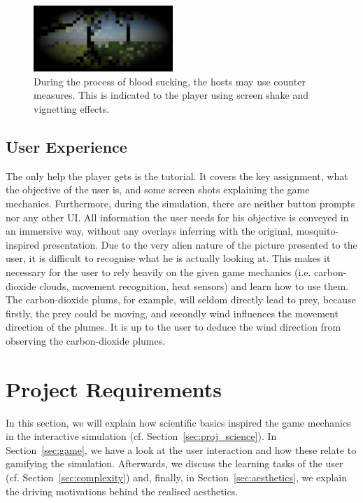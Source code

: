 \documentclass{sig-alternate-05-2015}
\begin{document}
\begin{figure}[ht!]
\includegraphics[width=0.47\textwidth]{Figures/danger.png}
\caption{During the process of blood sucking, the hosts may use counter measures. This is indicated to the player using screen shake and vignetting effects.}
\label{fig:danger}
\end{figure}



\subsection{User Experience}
\label{sec:ux}
The only help the player gets is the tutorial. It covers the key assignment, what the objective of the user is, and some screen shots explaining the game mechanics. Furthermore, during the simulation, there are neither button prompts nor any other UI. All information the user needs for his objective is conveyed in an immersive way, without any overlays inferring with the original, mosquito-inspired presentation. 
Due to the very alien nature of the picture presented to the user, it is difficult to recognise what he is actually looking at. This makes it necessary for the user to rely heavily on the given game mechanics (i.e. carbon-dioxide clouds, movement recognition, heat sensors) and learn how to use them. The carbon-dioxide plums, for example, will seldom directly lead to prey, because firstly, the prey could be moving, and secondly wind influences the movement direction of the plumes. It is up to the user to deduce the wind direction from observing the carbon-dioxide plumes.

\section{Project Requirements}
\label{sec:projectreq}

In this section, we will explain how scientific basics inspired the game mechanics in the interactive simulation (cf. Section~\ref{sec:proj_science}). In Section~\ref{sec:game}, we have a look at the user interaction and how these relate to gamifying the simulation. Afterwards, we discuss the learning tasks of the user (cf. Section~\ref{sec:complexity}) and, finally, in Section~\ref{sec:aesthetics}, we explain the driving motivations behind the realised aesthetics.
\end{document}

